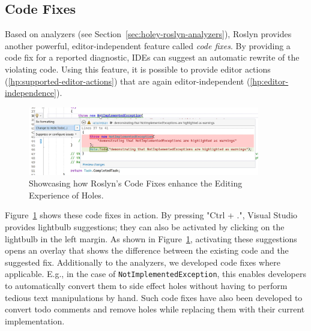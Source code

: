 \subsection{Code Fixes}
\label{sec:holey-code-fixes}
Based on analyzers (see Section~\ref{sec:holey-roslyn-analyzers}), Roslyn provides another powerful, editor-independent feature called \emph{code fixes}.
By providing a code fix for a reported diagnostic, IDEs can suggest an automatic rewrite of the violating code.
Using this feature, it is possible to provide editor actions (\ref{hp:supported-editor-actions}) that are again editor-independent (\ref{hp:editor-independence}).

\begin{figure}[ht]
    \centering
    \includegraphics[width=0.9\textwidth]{images/code-fixes}
    \caption{Showcasing how Roslyn's Code Fixes enhance the Editing Experience of Holes.}
    \label{fig:holey-code-fixes}
\end{figure}

Figure~\ref{fig:holey-code-fixes} shows these code fixes in action.
By pressing "Ctrl + .", Visual Studio provides lightbulb suggestions; they can also be activated by clicking on the lightbulb in the left margin.
As shown in Figure~\ref{fig:holey-code-fixes}, activating these suggestions opens an overlay that shows the difference between the existing code and the suggested fix.
Additionally to the analyzers, we developed code fixes where applicable.
E.g., in the case of \verb|NotImplementedException|, this enables developers to automatically convert them to side effect holes without having to perform tedious text manipulations by hand.
Such code fixes have also been developed to convert todo comments and remove holes while replacing them with their current implementation.

